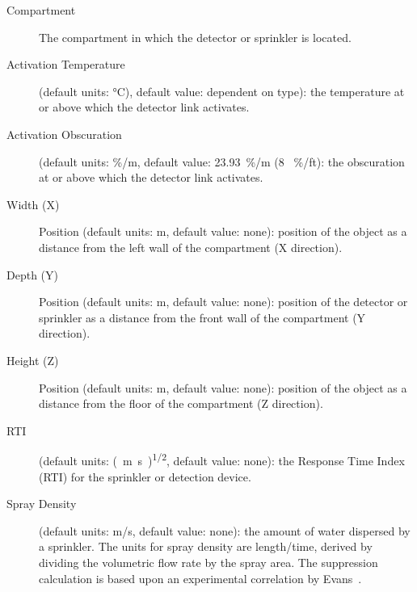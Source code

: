{{\begin{description}
\item[Compartment] The compartment in which the detector or sprinkler is located.

\item[Activation Temperature] (default units: \unit{\degreeCelsius}), default value: dependent on type): the temperature at or above which the detector link activates.

\item[Activation Obscuration] (default units: \unit{\%/m}, default value: 23.93~\unit{\%/m} (8 ~\unit{\%/ft}): the obscuration at or above which the detector link activates.

\item[Width (X)] Position (default units: \unit{m}, default value: none): position of the object as a distance from the left wall of the compartment (X direction).

\item[Depth (Y)] Position (default units: \unit{m}, default value: none): position of the detector or sprinkler as a distance from the front wall of the compartment (Y direction).

\item[Height (Z)] Position (default units: \unit{m}, default value: none): position of the object as a distance from the floor of the compartment (Z direction).

\item[RTI] (default units: \unit{(m.s)\tothe{1/2}}, default value: none): the Response Time Index (RTI) for the sprinkler or detection device.

\item[Spray Density] (default units: \unit{m/s}, default value: none): the amount of water dispersed by a sprinkler.  The units for spray density are length/time, derived by dividing the volumetric flow rate by the spray area. The suppression calculation is based upon an experimental correlation by Evans~\cite{Evans:1993}.
\end{description}

}}
